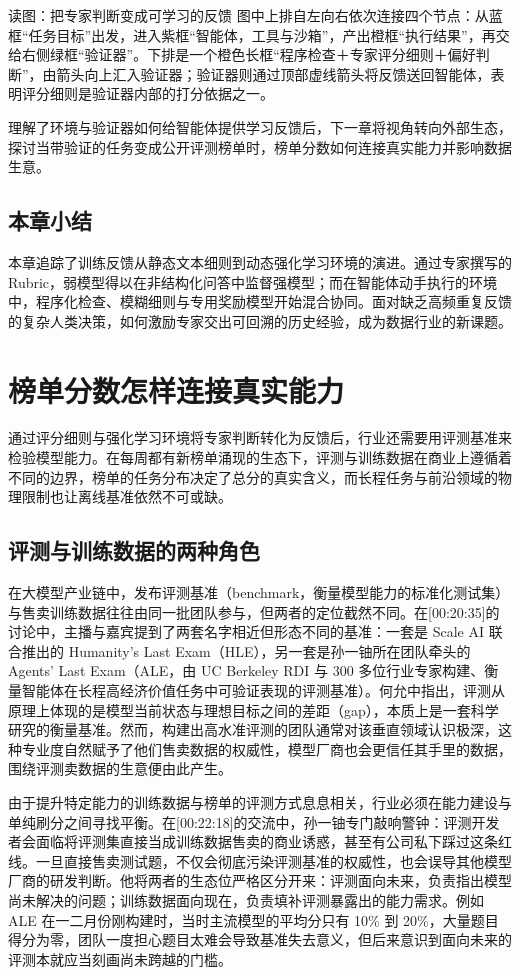 \documentclass[UTF8,a4paper,11pt,fontset=fandol]{ctexart}
\begin{document}
\begin{knowledgebox}{读图：把专家判断变成可学习的反馈}
图中上排自左向右依次连接四个节点：从蓝框“任务目标”出发，进入紫框“智能体，工具与沙箱”，产出橙框“执行结果”，再交给右侧绿框“验证器”。下排是一个橙色长框“程序检查＋专家评分细则＋偏好判断”，由箭头向上汇入验证器；验证器则通过顶部虚线箭头将反馈送回智能体，表明评分细则是验证器内部的打分依据之一。
\end{knowledgebox}
理解了环境与验证器如何给智能体提供学习反馈后，下一章将视角转向外部生态，探讨当带验证的任务变成公开评测榜单时，榜单分数如何连接真实能力并影响数据生意。
\subsection{本章小结}
本章追踪了训练反馈从静态文本细则到动态强化学习环境的演进。通过专家撰写的 Rubric，弱模型得以在非结构化问答中监督强模型；而在智能体动手执行的环境中，程序化检查、模糊细则与专用奖励模型开始混合协同。面对缺乏高频重复反馈的复杂人类决策，如何激励专家交出可回溯的历史经验，成为数据行业的新课题。
\section{榜单分数怎样连接真实能力}
通过评分细则与强化学习环境将专家判断转化为反馈后，行业还需要用评测基准来检验模型能力。在每周都有新榜单涌现的生态下，评测与训练数据在商业上遵循着不同的边界，榜单的任务分布决定了总分的真实含义，而长程任务与前沿领域的物理限制也让离线基准依然不可或缺。
\subsection{评测与训练数据的两种角色}
在大模型产业链中，发布评测基准（benchmark，衡量模型能力的标准化测试集）与售卖训练数据往往由同一批团队参与，但两者的定位截然不同。在[00:20:35]的讨论中，主播与嘉宾提到了两套名字相近但形态不同的基准：一套是 Scale AI 联合推出的 Humanity's Last Exam（HLE），另一套是孙一铀所在团队牵头的 Agents' Last Exam（ALE，由 UC Berkeley RDI 与 300 多位行业专家构建、衡量智能体在长程高经济价值任务中可验证表现的评测基准）。何允中指出，评测从原理上体现的是模型当前状态与理想目标之间的差距（gap），本质上是一套科学研究的衡量基准。然而，构建出高水准评测的团队通常对该垂直领域认识极深，这种专业度自然赋予了他们售卖数据的权威性，模型厂商也会更信任其手里的数据，围绕评测卖数据的生意便由此产生。

由于提升特定能力的训练数据与榜单的评测方式息息相关，行业必须在能力建设与单纯刷分之间寻找平衡。在[00:22:18]的交流中，孙一铀专门敲响警钟：评测开发者会面临将评测集直接当成训练数据售卖的商业诱惑，甚至有公司私下踩过这条红线。一旦直接售卖测试题，不仅会彻底污染评测基准的权威性，也会误导其他模型厂商的研发判断。他将两者的生态位严格区分开来：评测面向未来，负责指出模型尚未解决的问题；训练数据面向现在，负责填补评测暴露出的能力需求。例如 ALE 在一二月份刚构建时，当时主流模型的平均分只有 10\% 到 20\%，大量题目得分为零，团队一度担心题目太难会导致基准失去意义，但后来意识到面向未来的评测本就应当刻画尚未跨越的门槛。
\end{document}
